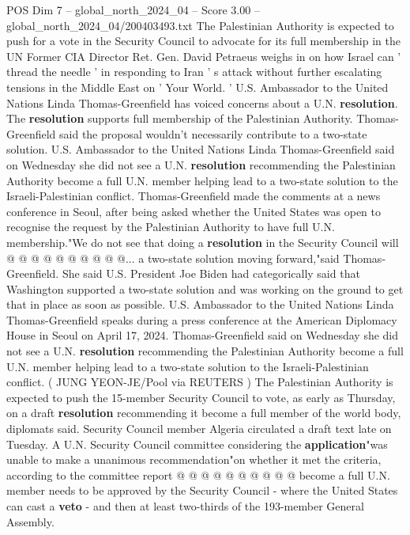 \begin{textsample}{POS Dim 7 – global\_north\_2024\_04 – Score 3.00 – global\_north\_2024\_04/200403493.txt}  \label{ex:f7_pos_224}
The Palestinian Authority is expected to push for a vote in the Security Council to advocate for its full membership in the UN Former CIA Director Ret.
Gen.
David Petraeus weighs in on how Israel can ' thread the needle ' in responding to Iran ' s attack without further escalating tensions in the Middle East on ' Your World. ' U.S.
Ambassador to the United Nations Linda Thomas-Greenfield has voiced concerns about a U.N. \textbf{resolution}.
The \textbf{resolution} supports full membership of the Palestinian Authority.
Thomas-Greenfield said the proposal wouldn't necessarily contribute to a two-state solution.
U.S.
Ambassador to the United Nations Linda Thomas-Greenfield said on Wednesday she did not see a U.N. \textbf{resolution} recommending the Palestinian Authority become a full U.N. member helping lead to a two-state solution to the Israeli-Palestinian conflict.
Thomas-Greenfield made the comments at a news conference in Seoul, after being asked whether the United States was open to recognise the request by the Palestinian Authority to have full U.N. membership."We do not see that doing a \textbf{resolution} in the Security Council will @ @ @ @ @ @ @ @ @ @... a two-state solution moving forward,"said Thomas-Greenfield.
She said U.S.
President Joe Biden had categorically said that Washington supported a two-state solution and was working on the ground to get that in place as soon as possible.
U.S.
Ambassador to the United Nations Linda Thomas-Greenfield speaks during a press conference at the American Diplomacy House in Seoul on April 17, 2024.
Thomas-Greenfield said on Wednesday she did not see a U.N. \textbf{resolution} recommending the Palestinian Authority become a full U.N. member helping lead to a two-state solution to the Israeli-Palestinian conflict. ( JUNG YEON-JE/Pool via REUTERS ) The Palestinian Authority is expected to push the 15-member Security Council to vote, as early as Thursday, on a draft \textbf{resolution} recommending it become a full member of the world body, diplomats said.
Security Council member Algeria circulated a draft text late on Tuesday.
A U.N.
Security Council committee considering the \textbf{application}"was unable to make a unanimous recommendation"on whether it met the criteria, according to the committee report @ @ @ @ @ @ @ @ @ @ become a full U.N. member needs to be approved by the Security Council - where the United States can cast a \textbf{veto} - and then at least two-thirds of the 193-member General Assembly.

\end{textsample}
